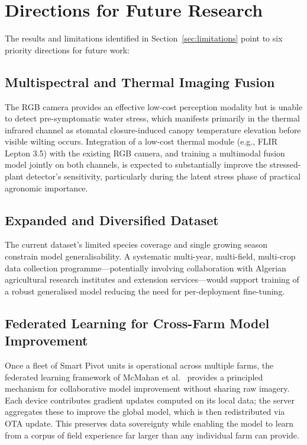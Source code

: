 \documentclass[12pt,a4paper]{report}
\begin{document}
\section{Directions for Future Research}
\label{sec:future}

The results and limitations identified in Section~\ref{sec:limitations} point to six priority directions for future work:

\subsection{Multispectral and Thermal Imaging Fusion}
The RGB camera provides an effective low-cost perception modality but is unable to detect pre-symptomatic water stress, which manifests primarily in the thermal infrared channel as stomatal closure-induced canopy temperature elevation before visible wilting occurs. Integration of a low-cost thermal module (e.g., FLIR Lepton 3.5) with the existing RGB camera, and training a multimodal fusion model jointly on both channels, is expected to substantially improve the stressed-plant detector's sensitivity, particularly during the latent stress phase of practical agronomic importance.

\subsection{Expanded and Diversified Dataset}
The current dataset's limited species coverage and single growing season constrain model generalisability. A systematic multi-year, multi-field, multi-crop data collection programme---potentially involving collaboration with Algerian agricultural research institutes and extension services---would support training of a robust generalised model reducing the need for per-deployment fine-tuning.

\subsection{Federated Learning for Cross-Farm Model Improvement}
Once a fleet of Smart Pivot units is operational across multiple farms, the federated learning framework of McMahan et al.~\cite{McMahan2017} provides a principled mechanism for collaborative model improvement without sharing raw imagery. Each device contributes gradient updates computed on its local data; the server aggregates these to improve the global model, which is then redistributed via OTA update. This preserves data sovereignty while enabling the model to learn from a corpus of field experience far larger than any individual farm can provide.
\end{document}
